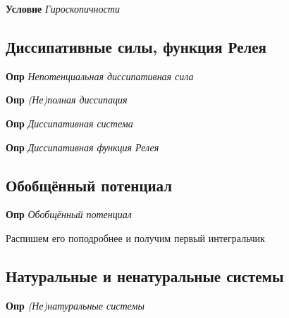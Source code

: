 \documentclass[a4paper, 14pt]{article}
\begin{document}
    \textbf{Условие} \textit{Гироскопичности}
    
    \subsection{Диссипативные силы, функция Релея}
    
    \textbf{Опр} \textit{Непотенциальная диссипативная сила}
    
    \textbf{Опр} \textit{(Не)полная диссипация}
    
    \textbf{Опр} \textit{Диссипативная система}
    
    \textbf{Опр} \textit{Диссипативная функция Релея}
    
    \subsection{Обобщённый потенциал}
    
    \textbf{Опр} \textit{Обобщённый потенциал}
    
    Распишем его поподробнее и получим первый интегральчик
    
    \subsection{Натуральные и ненатуральные системы}
    
    \textbf{Опр} \textit{(Не)натуральные системы}
    
\end{document}
